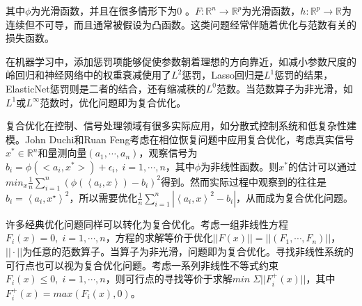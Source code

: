 \documentclass[macfonts]{njuthesis}
\begin{document}
其中$\phi$为光滑函数，并且在很多情形下为0 。$F: \mathbb{R}^{n} \rightarrow \mathbb{R}^{p}$为光滑函数，$h: \mathbb{R}^{p} \rightarrow \mathbb{R}$为连续但不可导，而且通常被假设为凸函数。这类问题经常伴随着优化与范数有关的损失函数。\par
在机器学习中，添加惩罚项能够促使参数朝着理想的方向靠近，如减小参数尺度的岭回归和神经网络中的权重衰减使用了$L^2$惩罚，Lasso回归\cite{Lasso}是$L^1$惩罚的结果，ElasticNet惩罚\cite{ElasticNet}则是二者的结合，还有缩减秩的$L^0$范数。当范数算子为非光滑，如$L^1$或$L^{\infty}$范数\cite{NonlinearEqLInfty}时，优化问题即为复合优化。
\par
复合优化在控制、信号处理领域有很多实际应用\cite{CharalambousC}，如分散式控制系统\cite{distributedcontrol}和低复杂性建模\cite{lowcomplexity}。John Duchi和Ruan Feng\cite{phaseretrieval}考虑在相位恢复问题中应用复合优化，考虑真实信号$x^*\in \mathbb{R}^n$和量测向量$(a_1,\cdots,a_n)$，观察信号为$b_i=\phi(<a_i,x^*>)+\epsilon_i,\;i=1,\cdots,n$，其中$\phi$为非线性函数。则$x^*$的估计可以通过$min_x \frac{1}{n} \sum_{i=1}^{n}\left(\phi\left(\left\langle a_{i}, x\right\rangle\right)-b_{i}\right)^{2}$得到。然而实际过程中观察到的往往是$b_{i}=\left\langle a_{i}, x^{\star}\right\rangle^{2}$，所以需要优化$\frac{1}{n} \sum_{i=1}^{n}\left|\left\langle a_{i}, x\right\rangle^{2}-b_{i}\right|$，从而成为复合优化问题。

许多经典优化问题同样可以转化为复合优化。考虑一组非线性方程$F_i(x)=0,\;i=1,\cdots,n$，方程的求解等价于优化$||F(x)||=||(F_1,\cdots,F_n)||$，$||\cdot||$为任意的范数算子\cite{NonlinearEqLp}。当算子为非光滑，问题即为复合优化。寻找非线性系统的可行点也可以视为复合优化问题。考虑一系列非线性不等式约束$F_i(x)\leq 0,\;i=1,\cdots,n$，则可行点的寻找等价于求解$min\;\Sigma ||F^+_i(x)||$，其中$F^+_i(x)=max(F_i(x),0)$。
\end{document}
